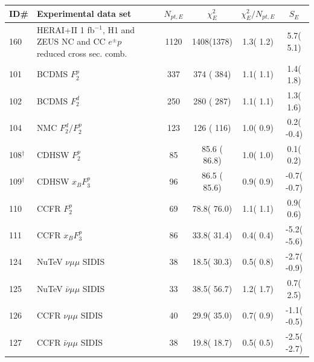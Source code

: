 \begin{table}[htbp]
\begin{tabular}{|l|lr|c|c|c|c|}
\hline
\textbf{ID\# }  & \textbf{Experimental data set} &  & $N_{pt, E}$  & $\chi^2_E$ & $\chi^{2}_E/N_{pt, E}$  & $S_E$ \tabularnewline
\hline
\hline
 160 & HERAI+II 1 fb$^{-1}$, H1 and ZEUS NC and CC $e^\pm p$ reduced cross sec. comb.      & \cite{Abramowicz:2015mha}   & 1120  &  1408(1378) &   1.3( 1.2) &   5.7(  5.1)   \tabularnewline\hline
 101 & BCDMS $F_{2}^{p}$                                                                   & \cite{Benvenuti:1989rh}     &  337  &   374 ( 384) &   1.1( 1.1) &   1.4(  1.8)   \tabularnewline\hline
 102 & BCDMS $F_{2}^{d}$                                                                   & \cite{Benvenuti:1989fm}     &  250  &   280 ( 287) &   1.1( 1.1) &   1.3(  1.6)   \tabularnewline\hline
 104 & NMC $F_{2}^{d}/F_{2}^{p}$                                                           & \cite{Arneodo:1996qe}       &  123  &   126 ( 116) &   1.0( 0.9) &   0.2( -0.4)   \tabularnewline\hline
 108$^{\dagger}$ & CDHSW $F_{2}^{p}$                                                       & \cite{Berge:1989hr}         &   85  &    85.6 ( 86.8) &   1.0( 1.0) &   0.1(  0.2)   \tabularnewline\hline
 109$^{\dagger}$ & CDHSW $x_B F_{3}^{p}$                                                       & \cite{Berge:1989hr}         &   96  &    86.5 (  85.6) &   0.9( 0.9) &  -0.7( -0.7)   \tabularnewline\hline
 110 & CCFR $F_{2}^{p}$                                                                    & \cite{Yang:2000ju}          &   69  &    78.8(  76.0) &   1.1( 1.1) &   0.9(  0.6)   \tabularnewline\hline
 111 & CCFR $x_B F_{3}^{p}$                                                                   & \cite{Seligman:1997mc}      &   86  &    33.8(  31.4) &   0.4( 0.4) &  -5.2( -5.6)   \tabularnewline\hline
 124 & NuTeV $\nu\mu\mu$ SIDIS                                                             & \cite{Mason:2006qa}         &   38  &    18.5(  30.3) &   0.5( 0.8) &  -2.7( -0.9)   \tabularnewline\hline
 125 & NuTeV $\bar\nu \mu\mu$ SIDIS                                                        & \cite{Mason:2006qa}         &   33  &    38.5(  56.7) &   1.2( 1.7) &   0.7(  2.5)   \tabularnewline\hline
 126 & CCFR $\nu\mu\mu$ SIDIS                                                              & \cite{Goncharov:2001qe}     &   40  &    29.9(  35.0) &   0.7( 0.9) &  -1.1( -0.5)   \tabularnewline\hline
 127 & CCFR  $\bar\nu \mu\mu$ SIDIS                                                        & \cite{Goncharov:2001qe}     &   38  &    19.8(  18.7) &   0.5( 0.5) &  -2.5( -2.7)   \tabularnewline\hline

\end{tabular}
\end{table}
